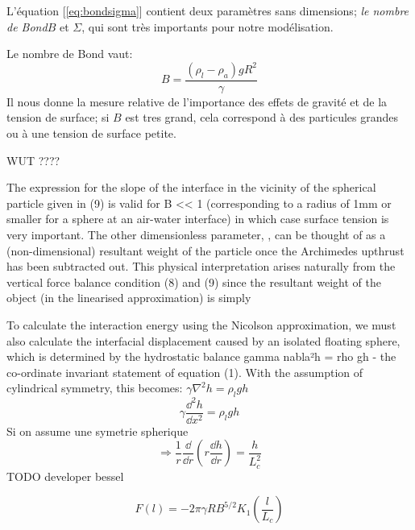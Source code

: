 
    L'équation [\ref{eq:bondsigma}] contient deux paramètres sans dimensions; \textit{le nombre de Bond}$B$ et $\Sigma$, qui sont très importants pour notre modélisation.

    Le nombre de Bond vaut:
    \begin{equation}
        B = \frac{(\rho_l-\rho_{a})gR^2}{\gamma}
    \end{equation}
    Il nous donne la mesure relative de l'importance des effets de gravité et de la tension de surface; si $B$ est tres grand, cela correspond à des particules grandes ou à une tension de surface petite. 

    WUT ????

    The expression for the slope of the interface in the vicinity of the spherical particle given in (9) is valid for B << 1 (corresponding to a radius of  1mm or smaller for a sphere at an air-water interface) in which case surface tension is very important. The other dimensionless parameter, , can be thought of as a (non-dimensional) resultant weight of the particle once the Archimedes upthrust has been subtracted out. This physical interpretation arises naturally from the vertical force balance condition (8) and (9) since the resultant weight of the object (in the linearised approximation) is simply 

    To calculate the interaction energy using the Nicolson
    approximation, we must also calculate the interfacial displacement caused by an isolated floating sphere, which is determined by the hydrostatic balance gamma nabla²h = rho gh - the co-ordinate invariant statement of equation (1). With the assumption of cylindrical symmetry, this becomes:
    \(\gamma \nabla^2h = \rho_l g h\)
    \begin{equation}
        \gamma \frac{\dd^2h}{\dd x^2} = \rho_l g h
    \end{equation}
    Si on assume une symetrie spherique
    \begin{equation}
        \Rightarrow \frac{1}{r} \frac{\dd}{\dd r} \left( r\frac{\dd h}{\dd r}\right) = \frac{h}{L_c^2}
    \end{equation}
    TODO developer bessel
    \cite{introtoBessel}

    \begin{equation}
        \label{ForceEntreCheerios}
        F(l) = -2\pi \gamma R B^{5/2} K_1 \left( \frac{l}{L_c}\right)
    \end{equation}
